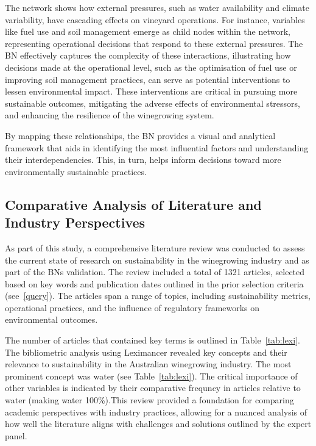 \documentclass[fleqn,10pt]{wlscirep}
\begin{document}
The network shows how external pressures, such as water availability and climate variability, have cascading effects on vineyard operations. For instance, variables like fuel use and soil management emerge as child nodes within the network, representing operational decisions that respond to these external pressures. The BN effectively captures the complexity of these interactions, illustrating how decisions made at the operational level, such as the optimisation of fuel use or improving soil management practices, can serve as potential interventions to lessen environmental impact. These interventions are critical in pursuing more sustainable outcomes, mitigating the adverse effects of environmental stressors, and enhancing the resilience of the winegrowing system.

By mapping these relationships, the BN provides a visual and analytical framework that aids in identifying the most influential factors and understanding their interdependencies. This, in turn, helps inform decisions toward more environmentally sustainable practices.

\subsection{Comparative Analysis of Literature and Industry Perspectives}

As part of this study, a comprehensive literature review was conducted to assess the current state of research on sustainability in the winegrowing industry and as part of the BNs validation. The review included a total of 1321 articles, selected based on key words and publication dates outlined in the prior selection criteria (see~\ref{query}). The articles span a range of topics, including sustainability metrics, operational practices, and the influence of regulatory frameworks on environmental outcomes.

The number of articles that contained key terms is outlined in Table~\ref{tab:lexi}. The bibliometric analysis using Leximancer revealed key concepts and their relevance to sustainability in the Australian winegrowing industry. The most prominent concept was water (see Table~\ref{tab:lexi}). The critical importance of other variables is indicated by their comparative frequncy in articles relative to water (making water 100\%).This review provided a foundation for comparing academic perspectives with industry practices, allowing for a nuanced analysis of how well the literature aligns with challenges and solutions outlined by the expert panel.
\end{document}
